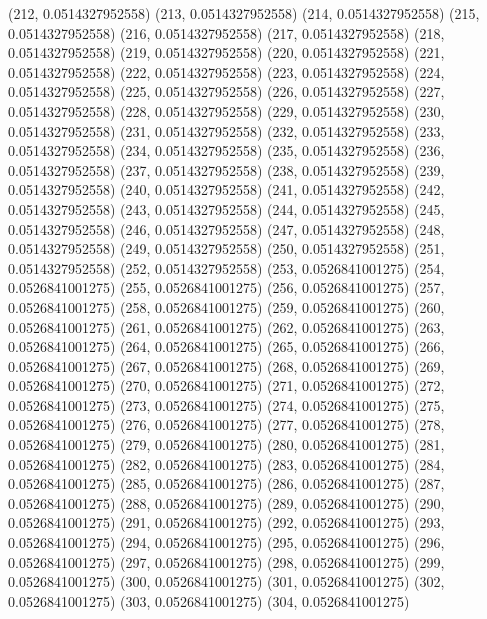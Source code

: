 {					(212, 0.0514327952558)
					(213, 0.0514327952558)
					(214, 0.0514327952558)
					(215, 0.0514327952558)
					(216, 0.0514327952558)
					(217, 0.0514327952558)
					(218, 0.0514327952558)
					(219, 0.0514327952558)
					(220, 0.0514327952558)
					(221, 0.0514327952558)
					(222, 0.0514327952558)
					(223, 0.0514327952558)
					(224, 0.0514327952558)
					(225, 0.0514327952558)
					(226, 0.0514327952558)
					(227, 0.0514327952558)
					(228, 0.0514327952558)
					(229, 0.0514327952558)
					(230, 0.0514327952558)
					(231, 0.0514327952558)
					(232, 0.0514327952558)
					(233, 0.0514327952558)
					(234, 0.0514327952558)
					(235, 0.0514327952558)
					(236, 0.0514327952558)
					(237, 0.0514327952558)
					(238, 0.0514327952558)
					(239, 0.0514327952558)
					(240, 0.0514327952558)
					(241, 0.0514327952558)
					(242, 0.0514327952558)
					(243, 0.0514327952558)
					(244, 0.0514327952558)
					(245, 0.0514327952558)
					(246, 0.0514327952558)
					(247, 0.0514327952558)
					(248, 0.0514327952558)
					(249, 0.0514327952558)
					(250, 0.0514327952558)
					(251, 0.0514327952558)
					(252, 0.0514327952558)
					(253, 0.0526841001275)
					(254, 0.0526841001275)
					(255, 0.0526841001275)
					(256, 0.0526841001275)
					(257, 0.0526841001275)
					(258, 0.0526841001275)
					(259, 0.0526841001275)
					(260, 0.0526841001275)
					(261, 0.0526841001275)
					(262, 0.0526841001275)
					(263, 0.0526841001275)
					(264, 0.0526841001275)
					(265, 0.0526841001275)
					(266, 0.0526841001275)
					(267, 0.0526841001275)
					(268, 0.0526841001275)
					(269, 0.0526841001275)
					(270, 0.0526841001275)
					(271, 0.0526841001275)
					(272, 0.0526841001275)
					(273, 0.0526841001275)
					(274, 0.0526841001275)
					(275, 0.0526841001275)
					(276, 0.0526841001275)
					(277, 0.0526841001275)
					(278, 0.0526841001275)
					(279, 0.0526841001275)
					(280, 0.0526841001275)
					(281, 0.0526841001275)
					(282, 0.0526841001275)
					(283, 0.0526841001275)
					(284, 0.0526841001275)
					(285, 0.0526841001275)
					(286, 0.0526841001275)
					(287, 0.0526841001275)
					(288, 0.0526841001275)
					(289, 0.0526841001275)
					(290, 0.0526841001275)
					(291, 0.0526841001275)
					(292, 0.0526841001275)
					(293, 0.0526841001275)
					(294, 0.0526841001275)
					(295, 0.0526841001275)
					(296, 0.0526841001275)
					(297, 0.0526841001275)
					(298, 0.0526841001275)
					(299, 0.0526841001275)
					(300, 0.0526841001275)
					(301, 0.0526841001275)
					(302, 0.0526841001275)
					(303, 0.0526841001275)
					(304, 0.0526841001275)
}
